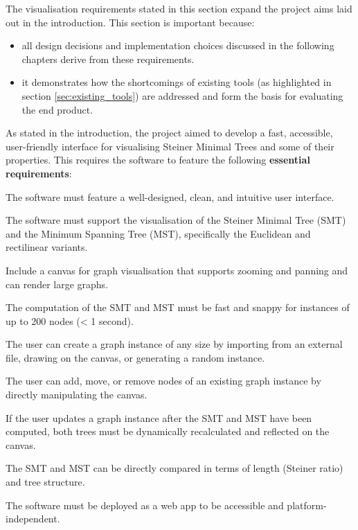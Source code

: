\documentclass{l4proj}
\begin{document}
The visualisation requirements stated in this section expand the project aims laid out in the introduction. This section is important because:
\begin{itemize}
    \item all design decisions and implementation choices discussed in the following chapters derive from these requirements.
    \item it demonstrates how the shortcomings of existing tools (as highlighted in section \ref{sec:existing_tools}) are addressed and form the basis for evaluating the end product.
\end{itemize}
As stated in the introduction, the project aimed to develop a fast, accessible, user-friendly interface for visualising Steiner Minimal Trees and some of their properties.
This requires the software to feature the following \textbf{essential requirements}:
\begin{requirements}
    \item The software must feature a well-designed, clean, and intuitive user interface.
    \item The software must support the visualisation of the Steiner Minimal Tree (SMT) and the Minimum Spanning Tree (MST), specifically the Euclidean and rectilinear variants.
    \item Include a canvas for graph visualisation that supports zooming and panning and can render large graphs.
    \item The computation of the SMT and MST must be fast and snappy for instances of up to 200 nodes (< 1 second).
    \item The user can create a graph instance of any size by importing from an external file, drawing on the canvas, or generating a random instance.
    \item The user can add, move, or remove nodes of an existing graph instance by directly manipulating the canvas.
    \item If the user updates a graph instance after the SMT and MST have been computed, both trees must be dynamically recalculated and reflected on the canvas.
    \item The SMT and MST can be directly compared in terms of length (Steiner ratio) and tree structure.
    \item The software must be deployed as a web app to be accessible and platform-independent.

\end{requirements}
\end{document}
